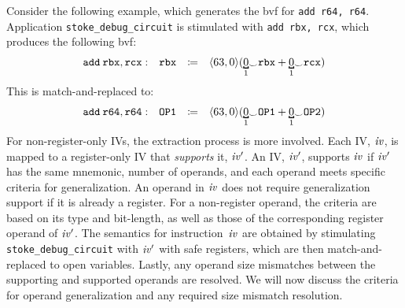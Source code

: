 Consider the following example, which generates the bvf for \texttt{add r64, r64}.
Application \texttt{stoke\_debug\_circuit} is stimulated with \texttt{add rbx, rcx}, which produces the following bvf:
\[
\begin{array}{llcl}
\mathtt{add\hspace{0.5ex} rbx, rcx}: 
& \mathtt{rbx} &\coloneqq& \langle 63, 0 \rangle(\bitmoded{1}{0} {_\smile} \mathtt{rbx} + \bitmoded{1}{0} {_\smile} \mathtt{rcx})
\end{array}
\]
This is match-and-replaced to:
\[
\begin{array}{llcl}
\mathtt{add\hspace{0.5ex} r64, r64}: 
& \mathtt{OP1} &\coloneqq&\langle 63, 0 \rangle(\bitmoded{1}{0} {_\smile} \mathtt{OP1} + \bitmoded{1}{0} {_\smile} \mathtt{OP2})
\end{array}
\]
For non-register-only IVs, the extraction process is more involved. 
Each IV, $\mathit{iv}$, is mapped to a register-only IV that \emph{supports} it, $\mathit{iv'}$. 
An IV, $\mathit{iv'}$, supports $\mathit{iv}$ if $\mathit{iv'}$ has the same mnemonic, number of operands, and each operand meets specific criteria for generalization.
An operand in $\mathit{iv}$ does not require generalization support if it is already a register.
For a non-register operand, the criteria are based on its type and bit-length, as well as those of the corresponding register operand of $\mathit{iv'}$.
The semantics for instruction~$\mathit{iv}$ are obtained by stimulating \texttt{stoke\_debug\_circuit} with $\mathit{iv'}$ with safe registers, which are then match-and-replaced to open variables.
Lastly, any operand size mismatches between the supporting and supported operands are resolved. 
We will now discuss the criteria for operand generalization and any required size mismatch resolution.

